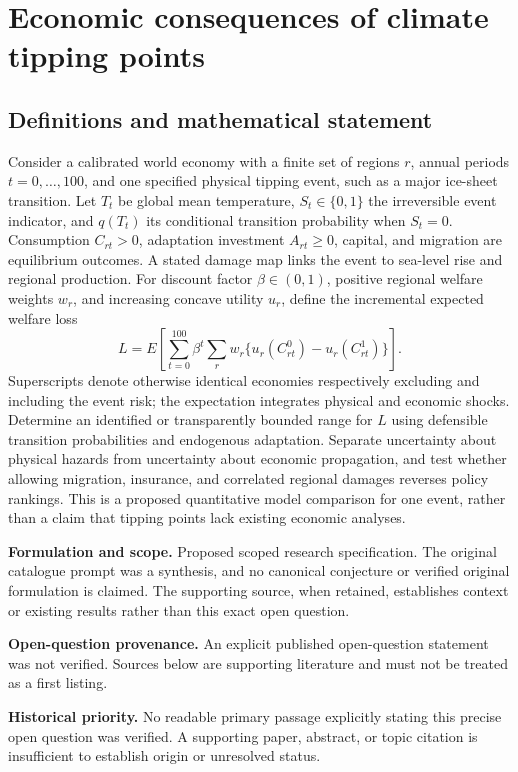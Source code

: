 \documentclass[11pt]{article}
\begin{document}
\section*{Economic consequences of climate tipping points}\label{30007713}
\subsection{Definitions and mathematical statement}
Consider a calibrated world economy with a finite set of regions \(r\), annual periods \(t=0,\ldots,100\), and one specified physical tipping event, such as a major ice-sheet transition. Let \(T_t\) be global mean temperature, \(S_t\in\{0,1\}\) the irreversible event indicator, and \(q(T_t)\) its conditional transition probability when \(S_t=0\). Consumption \(C_{rt}>0\), adaptation investment \(A_{rt}\geq0\), capital, and migration are equilibrium outcomes. A stated damage map links the event to sea-level rise and regional production. For discount factor \(\beta\in(0,1)\), positive regional welfare weights \(w_r\), and increasing concave utility \(u_r\), define the incremental expected welfare loss
\[L=E\!\left[\sum_{t=0}^{100}\beta^t\sum_r w_r\{u_r(C_{rt}^{0})-u_r(C_{rt}^{1})\}\right].\]
Superscripts denote otherwise identical economies respectively excluding and including the event risk; the expectation integrates physical and economic shocks. Determine an identified or transparently bounded range for \(L\) using defensible transition probabilities and endogenous adaptation. Separate uncertainty about physical hazards from uncertainty about economic propagation, and test whether allowing migration, insurance, and correlated regional damages reverses policy rankings. This is a proposed quantitative model comparison for one event, rather than a claim that tipping points lack existing economic analyses.

\par\textbf{Formulation and scope.} Proposed scoped research specification. The original catalogue prompt was a synthesis, and no canonical conjecture or verified original formulation is claimed. The supporting source, when retained, establishes context or existing results rather than this exact open question.

\par\textbf{Open-question provenance.} An explicit published open-question statement was not verified. Sources below are supporting literature and must not be treated as a first listing.

\par\textbf{Historical priority.} No readable primary passage explicitly stating this precise open question was verified. A supporting paper, abstract, or topic citation is insufficient to establish origin or unresolved status.
\end{document}
